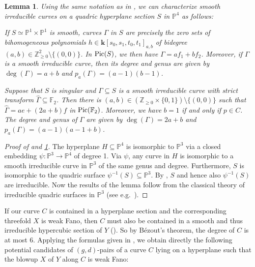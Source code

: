 \documentclass[english,11pt,reqno]{amsart}
\newcommand{\sub}{\subseteq}
\newcommand{\Pthree}{\mathbb{P}^3}
\newcommand{\Pfour}{\mathbb{P}^4}
\newcommand{\PxP}{\mathbb{P}^1 \times \mathbb{P}^1}
\newcommand{\kk}{\mathbf{k}}
\newcommand{\kPxP}{\kk[s_0,s_1,t_0,t_1]}
\newcommand{\Z}{\mathbb{Z}}
\newcommand{\Pic}{\textup{Pic}}
\newcommand{\Ftwo}{\mathbb{F}_2}
\newtheorem{lem}[thm]{Lemma}
\begin{document}
\begin{lem} \label{lem:curves_in_quadric_surface_in_P4}
Using the same notation as in , we can characterize smooth irreducible curves on a quadric hyperplane section $S$ in $\Pfour$ as follows:
\begin{enumlem}
\item If $S\simeq \PxP$ is smooth, curves $\Gamma$ in $S$ are precisely the zero sets of bihomogeneous polynomials $h\in \kPxP_{a,b}$ of bidegree $(a,b)\in \Z^2_{\geq 0} \setminus \{(0,0)\}$. In $\Pic(S)$, we then have $\Gamma=af_1+bf_2$. Moreover, if $\Gamma$ is a smooth irreducible curve, then its degree and genus are given by $\deg(\Gamma) = a+b$ and $p_a(\Gamma) = (a-1)(b-1)$.
\label{lem:curves_in_smooth_quadric_surface_in_P4}
%
\item Suppose that $S$ is singular and $\Gamma \sub S$ is a smooth irreducible curve with strict transform $\hat{\Gamma}\sub \Ftwo$. Then there is $(a,b)\in \left(\Z_{\geq 0} \times \{0,1\}\right) \setminus \{(0,0)\}$ such that $\hat{\Gamma} = a e + (2a+b)f$ in $\Pic(\Ftwo)$. Moreover, we have $b=1$ if and only if $p\in C$. The degree and genus of $\Gamma$ are given by $\deg(\Gamma)=2a+b$ and $p_a(\Gamma) = (a-1)(a-1+b)$. 
\label{lem:curves_in_singular_quadric_surface_in_P4}
\end{enumlem}	
\end{lem}
%
\begin{proof}[Proof of  and \ref{lem:curves_in_quadric_surface_in_P4}]
The hyperplane $H\sub \Pfour$ is isomorphic to $\Pthree$ via a closed embedding $\psi:\Pthree \rightarrow \Pfour$ of degree 1. Via $\psi$, any curve in $H$ is isomorphic to a smooth irreducible curve in $\Pthree$ of the same genus and degree. Furthermore, $S$ is isomorphic to the quadric surface $\psi^{-1}(S)\sub \Pthree$.  By , $S$ and hence also $\psi^{-1}(S)$ are irreducible. Now the results of the lemma follow from the classical theory of irreducible quadric surfaces in $\Pthree$ (see e.g.\ \cite[Chapter 2]{Miles_Reid_Chapters_on_algebraic_surfaces}).
\end{proof}
%
If our curve $C$ is contained in a hyperplane section and the corresponding threefold $X$ is weak Fano, then $C$ must also be contained in a smooth and thus irreducible hypercubic section of $Y$ (). So by Bézout's theorem, the degree of $C$ is at most $6$. Applying the formulas given in , we obtain directly the following potential candidates of $(g,d)$-pairs of a curve $C$ lying on a hyperplane such that the blowup $X$ of $Y$ along $C$ is weak Fano:
\end{document}
